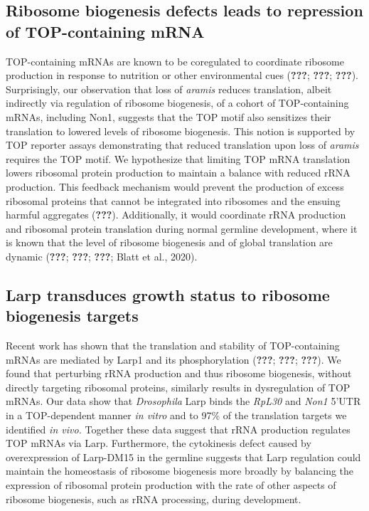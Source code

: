 \documentclass[12pt,oneside]{reedthesis}
\begin{document}
\hypertarget{ribosome-biogenesis-defects-leads-to-repression-of-top-containing-mrna}{%
\subsection{Ribosome biogenesis defects leads to repression of TOP-containing mRNA}\label{ribosome-biogenesis-defects-leads-to-repression-of-top-containing-mrna}}

TOP-containing mRNAs are known to be coregulated to coordinate ribosome production in response to nutrition or other environmental cues ({\textbf{???}}; {\textbf{???}}; {\textbf{???}}). Surprisingly, our observation that loss of \emph{aramis} reduces translation, albeit indirectly via regulation of ribosome biogenesis, of a cohort of TOP-containing mRNAs, including Non1, suggests that the TOP motif also sensitizes their translation to lowered levels of ribosome biogenesis. This notion is supported by TOP reporter assays demonstrating that reduced translation upon loss of \emph{aramis} requires the TOP motif. We hypothesize that limiting TOP mRNA translation lowers ribosomal protein production to maintain a balance with reduced rRNA production. This feedback mechanism would prevent the production of excess ribosomal proteins that cannot be integrated into ribosomes and the ensuing harmful aggregates ({\textbf{???}}). Additionally, it would coordinate rRNA production and ribosomal protein translation during normal germline development, where it is known that the level of ribosome biogenesis and of global translation are dynamic ({\textbf{???}}; {\textbf{???}}; {\textbf{???}}; Blatt et al., 2020).

\hypertarget{larp-transduces-growth-status-to-ribosome-biogenesis-targets}{%
\subsection{Larp transduces growth status to ribosome biogenesis targets}\label{larp-transduces-growth-status-to-ribosome-biogenesis-targets}}

Recent work has shown that the translation and stability of TOP-containing mRNAs are mediated by Larp1 and its phosphorylation ({\textbf{???}}; {\textbf{???}}; {\textbf{???}}). We found that perturbing rRNA production and thus ribosome biogenesis, without directly targeting ribosomal proteins, similarly results in dysregulation of TOP mRNAs. Our data show that \emph{Drosophila} Larp binds the \emph{RpL30} and \emph{Non1} 5'UTR in a TOP-dependent manner \emph{in vitro} and to 97\% of the translation targets we identified \emph{in vivo.} Together these data suggest that rRNA production regulates TOP mRNAs via Larp. Furthermore, the cytokinesis defect caused by overexpression of Larp-DM15 in the germline suggests that Larp regulation could maintain the homeostasis of ribosome biogenesis more broadly by balancing the expression of ribosomal protein production with the rate of other aspects of ribosome biogenesis, such as rRNA processing, during development.
\end{document}
